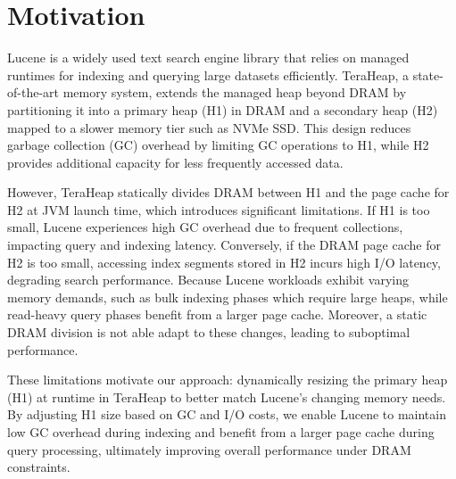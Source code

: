 \section{Motivation}
Lucene is a widely used text search engine library that relies on managed runtimes for indexing and querying large datasets efficiently. TeraHeap, a state-of-the-art memory system, extends the managed heap beyond DRAM by partitioning it into a primary heap (H1) in DRAM and a secondary heap (H2) mapped to a slower memory tier such as NVMe SSD. This design reduces garbage collection (GC) overhead by limiting GC operations to H1, while H2 provides additional capacity for less frequently accessed data.

However, TeraHeap statically divides DRAM between H1 and the page cache for H2 at JVM launch time, which introduces significant limitations. If H1 is too small, Lucene experiences high GC overhead due to frequent collections, impacting query and indexing latency. Conversely, if the DRAM page cache for H2 is too small, accessing index segments stored in H2 incurs high I/O latency, degrading search performance. Because Lucene workloads exhibit varying memory demands, such as bulk indexing phases which require large heaps, while read-heavy query phases benefit from a larger page cache. Moreover, a static DRAM division is not able adapt to these changes, leading to suboptimal performance.

These limitations motivate our approach: dynamically resizing the primary heap (H1) at runtime in TeraHeap to better match Lucene’s changing memory needs. By adjusting H1 size based on GC and I/O costs, we enable Lucene to maintain low GC overhead during indexing and benefit from a larger page cache during query processing, ultimately improving overall performance under DRAM constraints.
